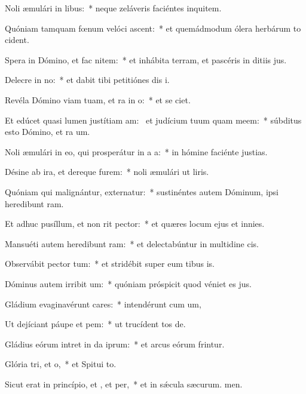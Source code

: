 \item Noli æmulári in libus:~* neque zeláveris faciéntes inquitem.
\item Quóniam tamquam fœnum velóci ascent:~* et quemádmodum ólera herbárum to cident.
\item Spera in Dómino, et fac nitem:~* et inhábita terram, et pascéris in ditiis jus.
\item Delecre in no:~* et dabit tibi petitiónes dis i.
\item Revéla Dómino viam tuam, et ra in o:~* et se ciet.
\item Et edúcet quasi lumen justítiam am:~\pscross{} et judícium tuum quam meem:~* súbditus esto Dómino, et ra um.
\item Noli æmulári in eo, qui prosperátur in a a:~* in hómine faciénte justias.
\item Désine ab ira, et dereque furem:~* noli æmulári ut liris.
\item Quóniam qui malignántur, externatur:~* sustinéntes autem Dóminum, ipsi heredibunt ram.
\item Et adhuc pusíllum, et non rit pector:~* et quæres locum ejus et  innies.
\item Mansuéti autem heredibunt ram:~* et delectabúntur in multidine cis.
\item Observábit pector tum:~* et stridébit super eum tibus is.
\item Dóminus autem irribit um:~* quóniam próspicit quod véniet es jus.
\item Gládium evaginavérunt cares:~* intendérunt cum um,
\item Ut dejíciant páupe et pem:~* ut trucídent tos de.
\item Gládius eórum intret in da iprum:~* et arcus eórum frintur.
\item Glória tri, et o,~* et Spitui to.
\item Sicut erat in princípio, et , et per,~* et in sǽcula sæcurum. men.
